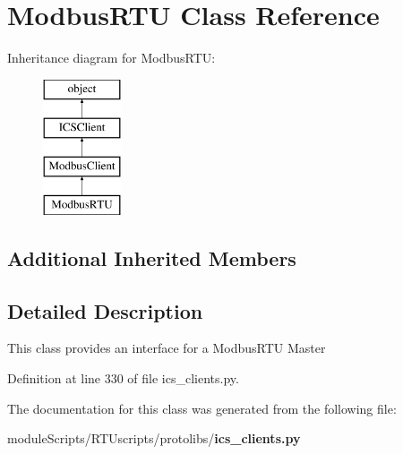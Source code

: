 \section{Modbus\+R\+T\+U Class Reference}
\label{classprotolibs_1_1ics__clients_1_1_modbus_r_t_u}
Inheritance diagram for Modbus\+R\+T\+U\+:\begin{figure}[H]
\begin{center}
\leavevmode
\includegraphics[height=4.000000cm]{classprotolibs_1_1ics__clients_1_1_modbus_r_t_u}
\end{center}
\end{figure}
\subsection*{Additional Inherited Members}


\subsection{Detailed Description}
\begin{DoxyVerb}This class provides an interface for a ModbusRTU Master\end{DoxyVerb}
 

Definition at line 330 of file ics\+\_\+clients.\+py.



The documentation for this class was generated from the following file\+:\begin{DoxyCompactItemize}
\item 
module\+Scripts/\+R\+T\+Uscripts/protolibs/{\bf ics\+\_\+clients.\+py}\end{DoxyCompactItemize}

